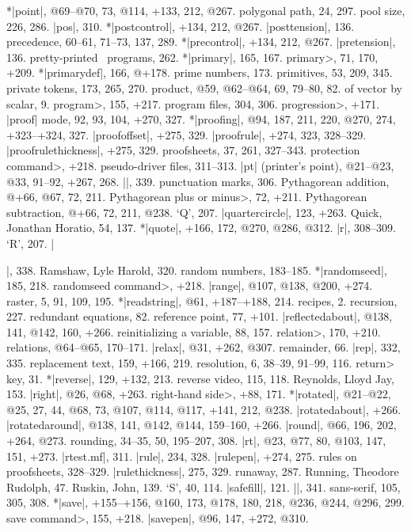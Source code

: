 *|point|, @69--@70, 73, @114, +133, 212, @267.
polygonal path, 24, 297.
pool size, 226, 286.
|pos|, 310.
*|postcontrol|, +134, 212, @267.
|posttension|, 136.
precedence, 60--61, 71--73, 137, 289.
*|precontrol|, +134, 212, @267.
|pretension|, 136.
pretty-printed \MF\ programs, 262.
*|primary|, 165, 167.
\<primary>, 71, 170, +209.
*|primarydef|, 166, @+178.
prime numbers, 173.
primitives, 53, 209, 345.
private tokens, 173, 265, 270.
product, @59, @62--@64, 69, 79--80, 82.
\sub of vector by scalar, 9.
\<program>, 155, +217.
program files, 304, 306.
\<progression>, +171.
|proof| mode, 92, 93, 104, +270, 327.
*|proofing|, @94, 187, 211, 220, @270, 274, +323--+324, 327.
|proofoffset|, +275, 329.
|proofrule|, +274, 323, 328--329.
|proofrulethickness|, +275, 329.
proofsheets, 37, 261, 327--343.
\<protection command>, +218.
pseudo-driver files, 311--313.
|pt| (printer's point), @21--@23, @33, 91--92, +267, 268.
|\punct|, 339.
punctuation marks, 306.
Pythagorean addition, @+66, @67, 72, 211.
\<Pythagorean plus or minus>, 72, +211.
Pythagorean subtraction, @+66, 72, 211, @238.
\newletter
`Q', 207.
|quartercircle|, 123, +263.
Quick, Jonathan Horatio, 54, 137.
*|quote|, +166, 172, @270, @286, @312.
\newletter
|r|, 308--309.
`R', 207.
|\raggedright|, 338.
Ramshaw, Lyle Harold, 320.
random numbers, 183--185.
*|randomseed|, 185, 218.
\<randomseed command>, +218.
|range|, @107, @138, @200, +274.
raster, 5, 91, 109, 195.
*|readstring|, @61, +187--+188, 214.
recipes, 2.
recursion, 227.
redundant equations, 82.
reference point, 77, +101.
|reflectedabout|, @138, 141, @142, 160, +266.
reinitializing a variable, 88, 157.
\<relation>, 170, +210.
relations, @64--@65, 170--171.
|relax|, @31, +262, @307.
remainder, 66.
|rep|, 332, 335.
replacement text, 159, +166, 219.
resolution, 6, 38--39, 91--99, 116.
\<return> key, 31.
*|reverse|, 129, +132, 213.
reverse video, 115, 118.
Reynolds, Lloyd Jay, 153.
|right|, @26, @68, +263.
\<right-hand side>, +88, 171.
*|rotated|, @21--@22, @25, 27, 44, @68, 73, @107, @114, @117, +141, 212, @238.
|rotatedabout|, +266.
|rotatedaround|, @138, 141, @142, @144, 159--160, +266.
|round|, @66, 196, 202, +264, @273.
rounding, 34--35, 50, 195--207, 308.
|rt|, @23, @77, 80, @103, 147, 151, +273.
|rtest.mf|, 311.
|rule|, 234, 328.
|rulepen|, +274, 275.
rules on proofsheets, 328--329.
|rulethickness|, 275, 329.
runaway, 287.
Running, Theodore Rudolph, 47.
Ruskin, John, 139.
\newletter
`S', 40, 114.
|safefill|, 121.
|\sample|, 341.
sans-serif, 105, 305, 308.
*|save|, +155--+156, @160, 173, @178, 180, 218, @236, @244, @296, 299.
\<save command>, 155, +218.
|savepen|, @96, 147, +272, @310.

